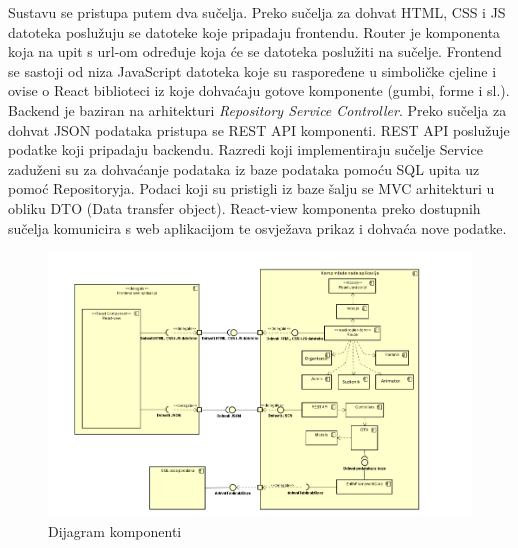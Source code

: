 		Sustavu se pristupa putem dva sučelja. Preko sučelja za dohvat HTML, CSS i JS datoteka poslužuju se datoteke koje pripadaju frontendu. Router je komponenta koja na upit s url-om određuje koja će se datoteka poslužiti na sučelje. Frontend se sastoji od niza JavaScript datoteka koje su raspoređene u simboličke cjeline i ovise o React biblioteci iz koje dohvaćaju gotove komponente (gumbi, forme i sl.). Backend je baziran na arhitekturi \textit{Repository Service Controller}. Preko
		sučelja za dohvat JSON podataka pristupa se REST API komponenti. REST API poslužuje podatke koji pripadaju backendu. Razredi koji implementiraju sučelje Service zaduženi su za dohvaćanje podataka iz baze podataka pomoću SQL upita uz pomoć Repositoryja. Podaci koji su pristigli iz baze šalju se MVC arhitekturi u obliku DTO (Data transfer object). React-view komponenta preko dostupnih sučelja komunicira s web aplikacijom te osvježava prikaz i dohvaća nove podatke.
		\begin{figure}[htb]
			\centering
			\includegraphics[scale=0.54]{dijagrami/dijagramKomponenti.PNG}
			\caption{Dijagram komponenti}
			\label{fig: dijagram komponenti}
		\end{figure}
			\eject